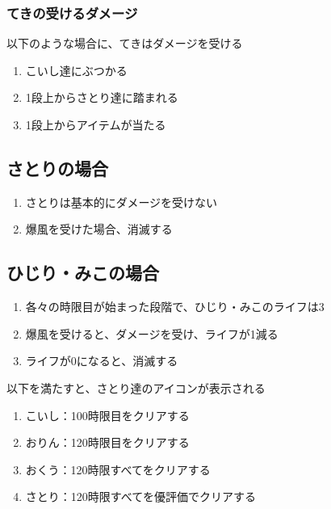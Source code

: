 \subsubsection{てきの受けるダメージ}
以下のような場合に、てきはダメージを受ける
\begin{enumerate}[label={\sarrow}]
\item こいし達にぶつかる
\item 1段上からさとり達に踏まれる
\item 1段上からアイテムが当たる
\end{enumerate}


\subsection{さとりの場合}
\begin{enumerate}[label={\sarrow}]
\item さとりは基本的にダメージを受けない
\item 爆風を受けた場合、消滅する
\end{enumerate}


\clearpage
\subsection{ひじり・みこの場合}
\begin{enumerate}[label={\sarrow}]
\item 各々の時限目が始まった段階で、ひじり・みこのライフは3
\item 爆風を受けると、ダメージを受け、ライフが1減る
\item ライフが0になると、消滅する
\end{enumerate}



以下を満たすと、さとり達のアイコンが表示される
\begin{enumerate}[label={\sarrow}]
\item こいし：100時限目をクリアする
\item おりん：120時限目をクリアする
\item おくう：120時限すべてをクリアする
\item さとり：120時限すべてを優評価でクリアする
\end{enumerate}



